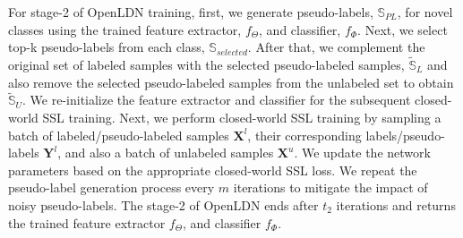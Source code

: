 \documentclass[runningheads]{eccv2022submission}
\begin{document}
For stage-2 of OpenLDN training, first, we generate pseudo-labels, $\mathbb{S}_{PL}$, for novel classes using the trained feature extractor, $f_{\Theta}$, and classifier, $f_{\Phi}$. Next, we select top-k pseudo-labels from each class, $\mathbb{S}_{selected}$. After that, we complement the original set of labeled samples with the selected pseudo-labeled samples, $\mathbb{\tilde{S}}_L$ and also remove the selected pseudo-labeled samples from the unlabeled set to obtain $\mathbb{\tilde{S}}_U$. We re-initialize the feature extractor and classifier for the subsequent closed-world SSL training. Next, we perform closed-world SSL training by sampling a batch of labeled/pseudo-labeled samples $\mathbf{X}^l$, their corresponding labels/pseudo-labels $\mathbf{Y}^l$, and also a batch of unlabeled samples $\mathbf{X}^u$. We update the network parameters based on the appropriate closed-world SSL loss. We repeat the pseudo-label generation process every $m$ iterations to mitigate the impact of noisy pseudo-labels. The stage-2 of OpenLDN ends after $t_2$ iterations and returns the trained feature extractor $f_{\Theta}$, and classifier $f_{\Phi}$.                 
\end{document}
